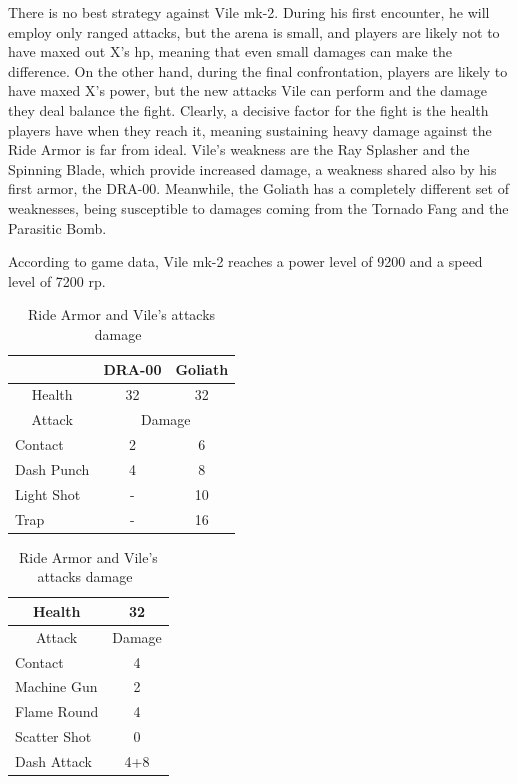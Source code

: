 There is no best strategy against Vile mk-2. During his first encounter, he will employ only ranged attacks, but the arena is small, and players are likely not to have maxed out X's hp, meaning that even small damages can make the difference. On the other hand, during the final confrontation, players are likely to have maxed X's power, but the new attacks Vile can perform and the damage they deal balance the fight. Clearly, a decisive factor for the fight is the health players have when they reach it, meaning sustaining heavy damage against the Ride Armor is far from ideal. Vile's weakness are the Ray Splasher and the Spinning Blade, which provide increased damage, a weakness shared also by his first armor, the DRA-00. Meanwhile, the Goliath has a completely different set of weaknesses, being susceptible to damages coming from the Tornado Fang and the Parasitic Bomb.

According to game data, Vile mk-2 reaches a power level of 9200 and a speed level of 7200 rp.


\begin{table}[htp] 
	\centering
	\begin{minipage}{.47\linewidth}
		\centering
		\begin{tabular}[h]{l c c}
			&\multicolumn{1}{c}{DRA-00} &\multicolumn{1}{c}{Goliath}  \\
			\toprule
			\multicolumn{1}{c}{Health}  & 32 &32 \\
			\midrule
			\multicolumn{1}{c}{Attack} & \multicolumn{2}{c}{Damage}\\
			Contact & 2& 6\\
			Dash Punch& 4&8\\
			Light Shot& -&10\\
			Trap& -&16\\
			\bottomrule
		\end{tabular}
	\end{minipage}
	\begin{minipage}{.45\linewidth}
		\centering
		\begin{tabular}[h]{l c}
			\toprule
			\multicolumn{1}{c}{Health}  & 32 \\
			\midrule
			\multicolumn{1}{c}{Attack} & \multicolumn{1}{c}{Damage}\\
			Contact & 4 \\
			Machine Gun & 2\\
			Flame Round & 4\\
			Scatter Shot& 0\\
			Dash Attack& 4+8\\
			\bottomrule
		\end{tabular}
	\end{minipage}
	\caption{Ride Armor and Vile's attacks damage~\cite{wiki:Vile2,book:Compendium}}
\end{table}



